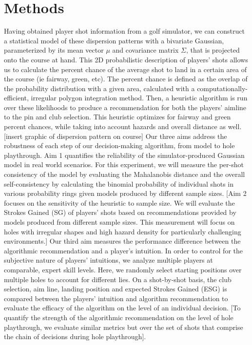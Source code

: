 \documentclass[11pt,a4paper]{article}
\begin{document}
\section{Methods}
Having obtained player shot information from a golf simulator, we can construct a statistical model of these dispersion patterns with a bivariate Gaussian, parameterized by its mean vector $\mu$ and covariance matrix $\Sigma$, that is projected onto the course at hand. This 2D probabilistic description of players’ shots allows us to calculate the percent chance of the average shot to land in a certain area of the course (ie fairway, green, etc). The percent chance is defined as the overlap of the probability distribution with a given area, calculated with a computationally-efficient, irregular polygon integration method. Then, a heuristic algorithm is run over these likelihoods to produce a recommendation for both the players’ aimline to the pin and club selection. This heuristic optimizes for fairway and green percent chances, while taking into account hazards and overall distance as well.
[insert graphic of dispersion pattern on course]
Our three aims address the robustness of each step of our decision-making algorithm, from model to hole playthrough. Aim 1 quantifies the reliability of the simulator-produced Gaussian model in real world scenarios. For this experiment, we will measure the per-shot consistency of the model by evaluating the Mahalanobis distance and the overall self-consistency by calculating the binomial probability of individual shots in various probability rings given models produced by different sample sizes. 
[Aim 2 focuses on the sensitivity of the heuristic to sample size. We will evaluate the Strokes Gained (SG) of players’ shots based on recommendations provided by models produced from different sample sizes. This measurement will focus on holes with irregular shapes and high hazard density for particularly challenging environments.]
Our third aim measures the performance difference between the algorithmic recommendation and a player’s intuition. In order to control for the subjective nature of players’ intuitions, we analyze multiple players at comparable, expert skill levels. Here, we randomly select starting positions over multiple holes to account for different lies. On a shot-by-shot basis, the club selection, aim line, landing position and expected Strokes Gained (ESG) is compared between the players’ intuition and algorithm recommendation to evaluate the efficacy of the algorithm on the level of an individual decision. [To quantify the strength of the algorithmic recommendation on the level of hole playthrough, we evaluate similar metrics but over the set of shots that comprise the chain of decisions during hole playthrough].  
\end{document}
